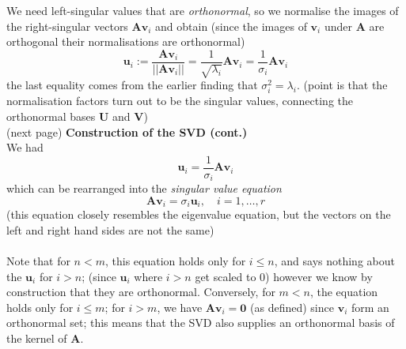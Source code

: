 \documentclass{report}
\begin{document}
We need left-singular values that are \textit{orthonormal}, so we normalise the
images of the right-singular vectors $\bm{Av}_i$ and obtain (since the images of $\bm{v}_i$ under $\bm{A}$ are
orthogonal their normalisations are orthonormal)
\begin{equation*}
\bm{u}_i:=\frac{\bm{Av}_i}{||\bm{Av}_i||}=\frac{1}{\sqrt{\lambda_i}}\bm{Av}_i
=\frac{1}{\sigma_i}\bm{Av}_i
\end{equation*}
the last equality comes from the earlier finding that 
$\sigma_i^2=\lambda_i$. (point is that the normalisation factors turn out to be the singular values, 
connecting the orthonormal bases $\bm{U}$ and $\bm{V}$)\\
(next page)
\newpage
\noindent\textbf{Construction of the SVD (cont.)}\\
We had
\begin{equation*}
\bm{u}_i=\frac{1}{\sigma_i}\bm{Av}_i
\end{equation*}
which can be rearranged into the \textit{singular value equation}
\begin{equation*}
\bm{Av}_i=\sigma_i\bm{u}_i,\quad i=1,\ldots,r
\end{equation*}
(this equation closely resembles the eigenvalue equation, but the vectors on the left and right hand sides are not
the same)\\
\vspace{1mm}\\
Note that for $n<m$, this equation holds only for $i\leq n$, and says nothing about the $\bm{u}_i$ for $i>n$;
(since $\bm{u}_i$ where $i>n$ get scaled to 0)
however we know by construction that they are orthonormal.
Conversely, for $m<n$, the equation holds only for $i\leq m$; for $i>m$, we have $\bm{Av}_i=\bm{0}$ (as defined)
since $\bm{v}_i$ form an orthonormal set; this means that
the SVD also supplies an orthonormal basis of the kernel
of $\bm{A}$.
\newpage
\end{document}
